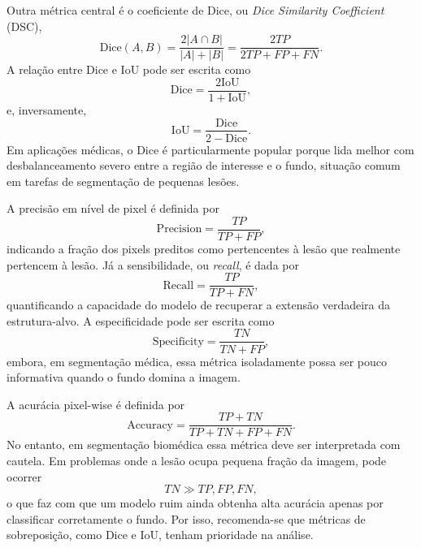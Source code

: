 \documentclass[tcc,capa]{texufpel}
\begin{document}
Outra métrica central é o coeficiente de Dice, ou \textit{Dice Similarity Coefficient} (DSC),
\begin{equation}
	\mathrm{Dice}(A,B)
	=
	\frac{2|A \cap B|}{|A| + |B|}
	=
	\frac{2TP}{2TP + FP + FN}.
\end{equation}
A relação entre Dice e IoU pode ser escrita como
\begin{equation}
	\mathrm{Dice}
	=
	\frac{2\mathrm{IoU}}{1+\mathrm{IoU}},
\end{equation}
e, inversamente,
\begin{equation}
	\mathrm{IoU}
	=
	\frac{\mathrm{Dice}}{2-\mathrm{Dice}}.
\end{equation}
Em aplicações médicas, o Dice é particularmente popular porque lida melhor com desbalanceamento severo entre a região de interesse e o fundo, situação comum em tarefas de segmentação de pequenas lesões.

A precisão em nível de pixel é definida por
\begin{equation}
	\mathrm{Precision}
	=
	\frac{TP}{TP+FP},
\end{equation}
indicando a fração dos pixels preditos como pertencentes à lesão que realmente pertencem à lesão. Já a sensibilidade, ou \textit{recall}, é dada por
\begin{equation}
	\mathrm{Recall}
	=
	\frac{TP}{TP+FN},
\end{equation}
quantificando a capacidade do modelo de recuperar a extensão verdadeira da estrutura-alvo. A especificidade pode ser escrita como
\begin{equation}
	\mathrm{Specificity}
	=
	\frac{TN}{TN+FP},
\end{equation}
embora, em segmentação médica, essa métrica isoladamente possa ser pouco informativa quando o fundo domina a imagem.

A acurácia pixel-wise é definida por
\begin{equation}
	\mathrm{Accuracy}
	=
	\frac{TP+TN}{TP+TN+FP+FN}.
\end{equation}
No entanto, em segmentação biomédica essa métrica deve ser interpretada com cautela. Em problemas onde a lesão ocupa pequena fração da imagem, pode ocorrer
\begin{equation}
	TN \gg TP,FP,FN,
\end{equation}
o que faz com que um modelo ruim ainda obtenha alta acurácia apenas por classificar corretamente o fundo. Por isso, recomenda-se que métricas de sobreposição, como Dice e IoU, tenham prioridade na análise.
\end{document}
